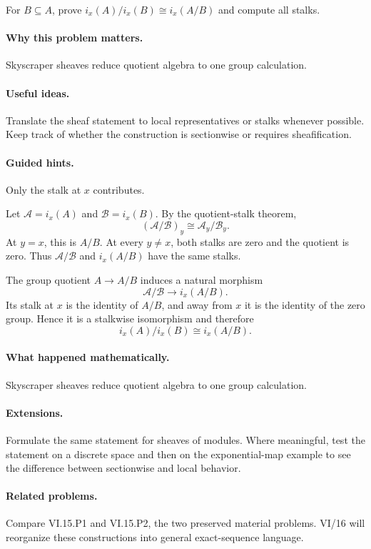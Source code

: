 \begin{problem}\label{prob:vi15-p15}
For $B\subseteq A$, prove $i_x(A)/i_x(B)\cong i_x(A/B)$ and compute all stalks.
\end{problem}

\ifdefined\FullProblemDossiers
\paragraph{Why this problem matters.}
Skyscraper sheaves reduce quotient algebra to one group calculation.

\paragraph{Useful ideas.}
Translate the sheaf statement to local representatives or stalks whenever possible.  Keep track of whether the construction is sectionwise or requires sheafification.

\paragraph{Guided hints.}
Only the stalk at $x$ contributes.

\begin{solution}
Let $\mathcal A=i_x(A)$ and $\mathcal B=i_x(B)$. By the quotient-stalk theorem,
\[
(\mathcal A/\mathcal B)_y\cong\mathcal A_y/\mathcal B_y.
\]
At $y=x$, this is $A/B$. At every $y\neq x$, both stalks are zero and the quotient is zero. Thus $\mathcal A/\mathcal B$ and $i_x(A/B)$ have the same stalks.

The group quotient $A\to A/B$ induces a natural morphism
\[
\mathcal A/\mathcal B\to i_x(A/B).
\]
Its stalk at $x$ is the identity of $A/B$, and away from $x$ it is the identity of the zero group. Hence it is a stalkwise isomorphism and therefore
\[
i_x(A)/i_x(B)\cong i_x(A/B).
\]
\end{solution}

\paragraph{What happened mathematically.}
Skyscraper sheaves reduce quotient algebra to one group calculation.

\paragraph{Extensions.}
Formulate the same statement for sheaves of modules.  Where meaningful, test the statement on a discrete space and then on the exponential-map example to see the difference between sectionwise and local behavior.

\paragraph{Related problems.}
Compare VI.15.P1 and VI.15.P2, the two preserved material problems.  VI/16 will reorganize these constructions into general exact-sequence language.
\fi
